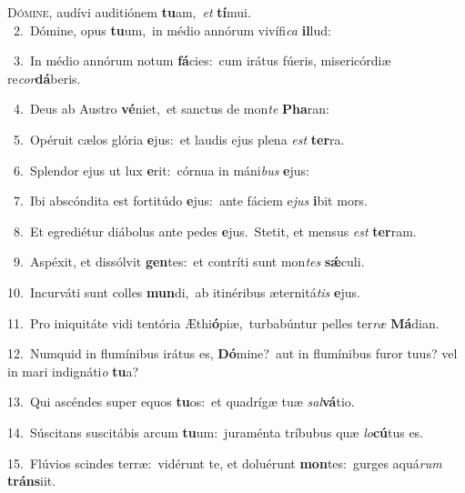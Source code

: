 \lettrine{\initial\textcolor{\initialcolor}{D}}{ómine,} audívi auditiónem \textbf{tu}\-am,~\star \textit{et} \textbf{tí}\-mui.\\
{\numbfont\textcolor{\numbcolor}{~2.}}~Dómine, opus \textbf{tu}\-um,~\star in médio annórum vivífi\textit{ca} \textbf{il}\-lud:\par
{\numbfont\textcolor{\numbcolor}{~3.}}~In médio annórum notum \textbf{fá}\-cies:~\star cum irátus fúeris, misericórdiæ re\-\textit{cor}\-\textbf{dá}beris.\par
{\numbfont\textcolor{\numbcolor}{~4.}}~Deus ab Austro \textbf{vé}\-niet,~\star et sanctus de mon\textit{te} \textbf{Pha}\-ran:\par
{\numbfont\textcolor{\numbcolor}{~5.}}~Opéruit cælos glória \textbf{e}\-jus:~\star et laudis ejus plena \textit{est} \textbf{ter}\-ra.\par
{\numbfont\textcolor{\numbcolor}{~6.}}~Splendor ejus ut lux \textbf{e}\-rit:~\star córnua in máni\textit{bus} \textbf{e}\-jus:\par
{\numbfont\textcolor{\numbcolor}{~7.}}~Ibi abscóndita est fortitúdo \textbf{e}\-jus:~\star ante fáciem e\textit{jus} \textbf{i}\-bit mors.\par
{\numbfont\textcolor{\numbcolor}{~8.}}~Et egrediétur diábolus ante pedes \textbf{e}\-jus.~\star Stetit, et mensus \textit{est} \textbf{ter}\-ram.\par
{\numbfont\textcolor{\numbcolor}{~9.}}~Aspéxit, et dissólvit \textbf{gen}\-tes:~\star et contríti sunt mon\textit{tes} \textbf{sǽ}\-culi.\par
{\numbfont\textcolor{\numbcolor}{10.}}~Incurváti sunt colles \textbf{mun}\-di,~\star ab itinéribus æternitá\textit{tis} \textbf{e}\-jus.\par
{\numbfont\textcolor{\numbcolor}{11.}}~Pro iniquitáte vidi tentória Æthi\-\textbf{ó}\-piæ,~\star turbabúntur pelles ter\textit{ræ} \textbf{Má}\-dian.\par
{\numbfont\textcolor{\numbcolor}{12.}}~Numquid in flumínibus irátus es, \textbf{Dó}\-mine?~\star aut in flumínibus furor tuus? vel in mari indignáti\textit{o} \textbf{tu}\-a?\par
{\numbfont\textcolor{\numbcolor}{13.}}~Qui ascéndes super equos \textbf{tu}\-os:~\star et quadrígæ tuæ \textit{sal}\-\textbf{vá}tio.\par
{\numbfont\textcolor{\numbcolor}{14.}}~Súscitans suscitábis arcum \textbf{tu}\-um:~\star juraménta tríbubus quæ \textit{lo}\-\textbf{cú}tus es.\par
{\numbfont\textcolor{\numbcolor}{15.}}~Flúvios scindes terræ:~\dagger vidérunt te, et doluérunt \textbf{mon}\-tes:~\star gurges aquá\textit{rum} \textbf{tráns}\-iit.\par
